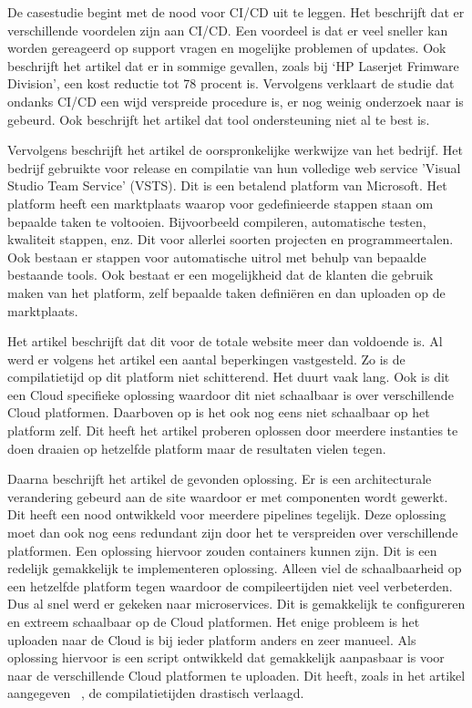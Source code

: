 De casestudie \autocite{Debroy2018} begint met de nood voor CI/CD uit te leggen. Het beschrijft dat er verschillende voordelen zijn aan CI/CD. Een voordeel is dat er veel sneller kan worden gereageerd op support vragen en mogelijke problemen of updates. Ook beschrijft het artikel dat er in sommige gevallen, zoals bij ‘HP Laserjet Frimware Division’, een kost reductie tot 78 procent is. Vervolgens verklaart de studie dat ondanks CI/CD een wijd verspreide procedure is, er nog weinig onderzoek naar is gebeurd. Ook beschrijft het artikel dat tool ondersteuning niet al te best is.

Vervolgens beschrijft het artikel \autocite{Debroy2018} de oorspronkelijke werkwijze van het bedrijf. Het bedrijf gebruikte voor release en compilatie van hun volledige web service 'Visual Studio Team Service' (VSTS). Dit is een betalend platform van Microsoft. Het platform heeft een marktplaats waarop voor gedefinieerde stappen staan om bepaalde taken te voltooien. Bijvoorbeeld compileren, automatische testen, kwaliteit stappen, enz. Dit voor allerlei soorten projecten en programmeertalen. Ook bestaan er stappen voor automatische uitrol met behulp van bepaalde bestaande tools. Ook bestaat er een mogelijkheid dat de klanten die gebruik maken van het platform, zelf bepaalde taken definiëren en dan uploaden op de marktplaats. 

Het artikel \autocite{Debroy2018} beschrijft dat dit voor de totale website meer dan voldoende is. Al werd er volgens het artikel een aantal beperkingen vastgesteld. Zo is de compilatietijd op dit platform niet schitterend. Het duurt vaak lang. Ook is dit een Cloud specifieke oplossing waardoor dit niet schaalbaar is over verschillende Cloud platformen. Daarboven op is het ook nog eens niet schaalbaar op het platform zelf. Dit heeft het artikel proberen oplossen door meerdere instanties te doen draaien op hetzelfde platform maar de resultaten vielen tegen.

Daarna beschrijft het artikel \autocite{Debroy2018} de gevonden oplossing. Er is een architecturale verandering gebeurd aan de site waardoor er met componenten wordt gewerkt. Dit heeft een nood ontwikkeld voor meerdere pipelines tegelijk. Deze oplossing moet dan ook nog eens redundant zijn door het te verspreiden over verschillende platformen. Een oplossing hiervoor zouden containers kunnen zijn. Dit is een redelijk gemakkelijk te implementeren oplossing. Alleen viel de schaalbaarheid op een hetzelfde platform tegen waardoor de compileertijden niet veel verbeterden. Dus al snel werd er gekeken naar microservices. Dit is gemakkelijk te configureren en extreem schaalbaar op de Cloud platformen. Het enige probleem is het uploaden naar de Cloud is bij ieder platform anders en zeer manueel. Als oplossing hiervoor is een script ontwikkeld dat gemakkelijk aanpasbaar is voor naar de verschillende Cloud platformen te uploaden. Dit heeft, zoals in het artikel aangegeven ~\textcite{Debroy2018}, de compilatietijden drastisch verlaagd.

